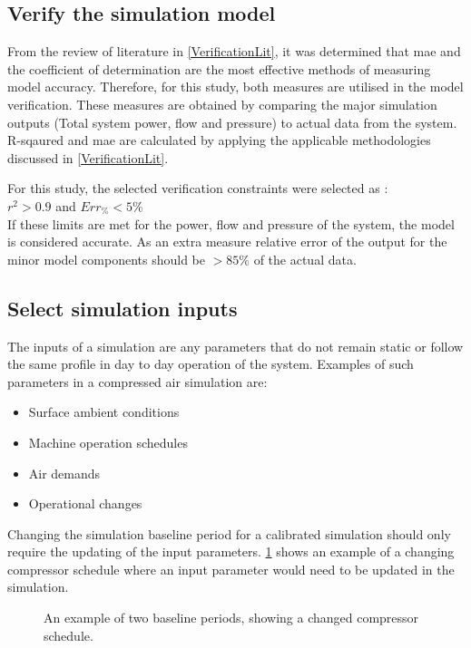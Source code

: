 	\subsection{Verify the simulation model}
	From the review of literature in \cref{VerificationLit}, it was determined that \gls{mae} and the coefficient of determination are the most effective methods of measuring model accuracy. Therefore, for this study, both measures are utilised in the model verification. These measures are obtained by comparing the major simulation outputs (Total system power, flow and pressure) to actual data from the system. R-sqaured and \gls{mae} are calculated by applying the applicable methodologies discussed in \cref{VerificationLit}.	
	\par 
	For this study, the selected verification constraints were selected as : \\ {$r^2 > 0.9 $ and $ Err_{\%} < 5\% $}\\ If these limits are met for the power, flow and pressure of the system, the model is considered accurate. As an extra measure relative error of the output for the minor model components should be $ > 85\%$ of the actual data. 
		
	\subsection{Select simulation inputs}
		The inputs of a simulation are any parameters that do not remain static or follow the same profile in day to day operation of the system. Examples of such parameters in a compressed air simulation are:
		\begin{itemize}
			\item Surface ambient conditions
			\item Machine operation schedules
			\item Air demands
			\item Operational changes
		\end{itemize} 
	Changing the simulation baseline period for a calibrated simulation should only require the updating of the input parameters. \cref{fig: Compressor schedule} shows an example of a changing compressor schedule where an input parameter would need to be updated in the simulation.	
			\clearpage
		\begin{figure}[h]
			\centering
			\fbox{}
			\caption{An example of two baseline periods, showing a changed compressor schedule.}
			\label{fig: Compressor schedule}
		\end{figure}
